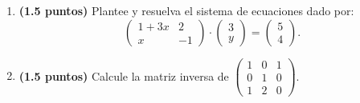 
\begin{enumerate}[label=\alph*)]
\item \textbf{(1.5 puntos)} Plantee y resuelva el sistema de ecuaciones dado por:
\[
\begin{pmatrix}1+3x&2\\x&-1\end{pmatrix}\cdot\begin{pmatrix}3\\y\end{pmatrix}=\begin{pmatrix}5\\4\end{pmatrix}.
\]
\item \textbf{(1.5 puntos)} Calcule la matriz inversa de $\begin{pmatrix}1&0&1\\0&1&0\\1&2&0\end{pmatrix}$.
\end{enumerate}
